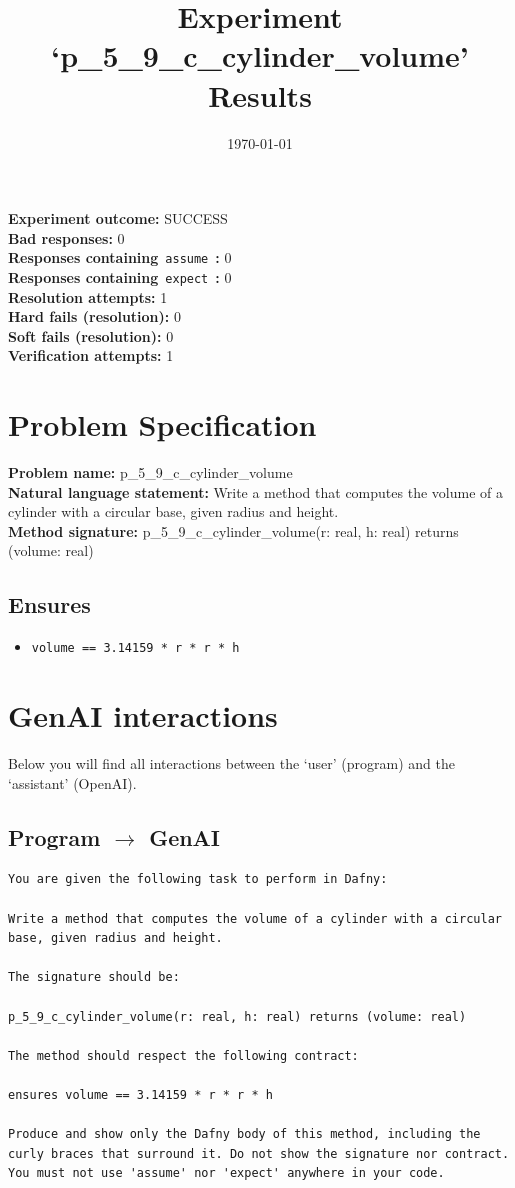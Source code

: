 \documentclass{article}
\begin{document}
\title{Experiment `p\_5\_9\_c\_cylinder\_volume' Results}
\author{\today}
\date{}
\maketitle
\textbf{Experiment outcome: }SUCCESS
\\\textbf{Bad responses: }0
\\\textbf{Responses containing}~\texttt{assume}~\textbf{: }0
\\\textbf{Responses containing}~\texttt{expect}~\textbf{: }0
\\\textbf{Resolution attempts: }1
\\\textbf{Hard fails (resolution): }0
\\\textbf{Soft fails (resolution): }0
\\\textbf{Verification attempts: }1
\section*{Problem Specification}
\textbf{Problem name: }p\_5\_9\_c\_cylinder\_volume
\\\textbf{Natural language statement: }Write a method that computes the volume of a cylinder with a circular base, given radius and height.
\\\textbf{Method signature: }p\_5\_9\_c\_cylinder\_volume(r: real, h: real) returns (volume: real)
\subsection*{Ensures}
\begin{itemize}
\item \texttt{volume == 3.14159 * r * r * h}
\end{itemize}
\clearpage
\section*{GenAI interactions}
Below you will find all interactions between the `user' (program) and the `assistant' (OpenAI).
\subsection*{Program $\rightarrow$ GenAI}
\begin{lstlisting}
You are given the following task to perform in Dafny:

Write a method that computes the volume of a cylinder with a circular base, given radius and height.

The signature should be:

p_5_9_c_cylinder_volume(r: real, h: real) returns (volume: real)

The method should respect the following contract:

ensures volume == 3.14159 * r * r * h

Produce and show only the Dafny body of this method, including the curly braces that surround it. Do not show the signature nor contract. You must not use 'assume' nor 'expect' anywhere in your code.
\end{lstlisting}
\end{document}
